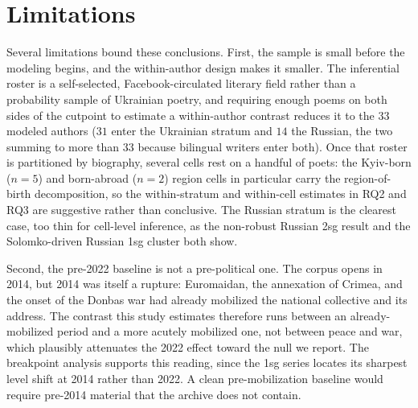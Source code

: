\documentclass[12pt]{interact}
\theoremstyle{plain}%
\theoremstyle{definition}
\theoremstyle{remark}
\begin{document}
\section{Limitations}

Several limitations bound these conclusions. First, the sample is small before the modeling begins, and the within-author design makes it smaller. The inferential roster is a self-selected, Facebook-circulated literary field rather than a probability sample of Ukrainian poetry, and requiring enough poems on both sides of the cutpoint to estimate a within-author contrast reduces it to the $33$ modeled authors ($31$ enter the Ukrainian stratum and $14$ the Russian, the two summing to more than $33$ because bilingual writers enter both). Once that roster is partitioned by biography, several cells rest on a handful of poets: the Kyiv-born ($n = 5$) and born-abroad ($n = 2$) region cells in particular carry the region-of-birth decomposition, so the within-stratum and within-cell estimates in RQ2 and RQ3 are suggestive rather than conclusive. The Russian stratum is the clearest case, too thin for cell-level inference, as the non-robust Russian 2sg result and the Solomko-driven Russian 1sg cluster both show.

Second, the pre-2022 baseline is not a pre-political one. The corpus opens in 2014, but 2014 was itself a rupture: Euromaidan, the annexation of Crimea, and the onset of the Donbas war had already mobilized the national collective and its address. The contrast this study estimates therefore runs between an already-mobilized period and a more acutely mobilized one, not between peace and war, which plausibly attenuates the 2022 effect toward the null we report. The breakpoint analysis supports this reading, since the 1sg series locates its sharpest level shift at 2014 rather than 2022. A clean pre-mobilization baseline would require pre-2014 material that the archive does not contain.
\end{document}

